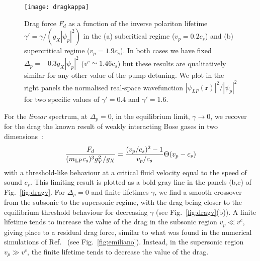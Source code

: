 \begin{figure}[tb]\centering
\texttt{[image: dragkappa]}
\caption{
%
Drag force $F_d$ as a function of the inverse polariton
lifetime $\gamma'=\gamma/(g_X |\psi_p|^2)$ in the (a) subcritical regime
($v_p=0.2 c_s$) and (b) supercritical regime ($v_p=1.9 c_s$). In both
cases we have fixed $\Delta_p=-0.3g_X|\psi_p|^2$ ($v^c \simeq 1.46 c_s$)
but these results are qualitatively similar for any other value of the
pump detuning. We plot in the right panels the normalised real-space
wavefunction $|\psi_{LP}(\bm{r})|^2/|\psi_p|^2$ for two specific
values of $\gamma'=0.4$ and $\gamma'=1.6$.
%
}\label{fig:dragk}
\end{figure}

For the \emph{linear} spectrum, at $\Delta_p=0$, in the equilibrium
limit, $\gamma \to 0$, we recover for the drag the known result of
weakly interacting Bose gases in two
dimensions~\cite{Astrakharchik_2004}:
%
\begin{equation}
  \frac{F_d}{(m_{\text{LP}}c_s)^3 g_V^2/g_X}=\frac{(v_p/c_s)^2 - 1}{v_p/c_s}
  \Theta(v_p - c_s)
\label{eq:drag0}
\end{equation}
%
with a threshold-like behaviour at a critical fluid velocity equal to
the speed of sound $c_s$. This limiting result is plotted as a bold
gray line in the panels (b,c) of Fig.~\ref{fig:dragv}. For
$\Delta_p=0$ and finite lifetimes $\gamma$, we find a smooth crossover
from the subsonic to the supersonic regime, with the drag being closer
to the equilibrium threshold behaviour for decreasing $\gamma$ (see
Fig.~\ref{fig:dragv}(b)). A finite lifetime tends to increase the
value of the drag in the subsonic region $v_p \ll v^c$, giving place
to a residual drag force, similar to what was found in the numerical
simulations of Ref.~\cite{Cancellieri_2010} (see
Fig.~\ref{fig:emiliano}). Instead, in the supersonic region
$v_p \gg v^c$, the finite lifetime tends to decrease the value of the
drag. 

